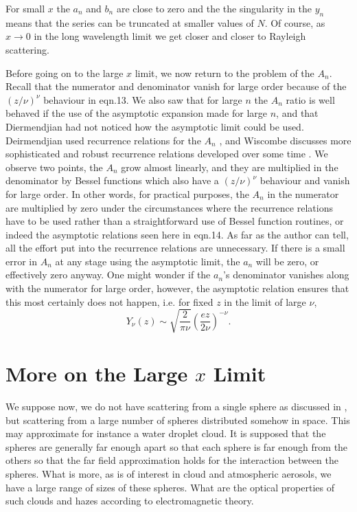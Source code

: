 For small $x$ the $a_n$ and $b_n$ are close to zero and the the singularity in the $y_n$
means that the series can be truncated at smaller values of $N$. Of course, as $x\rightarrow 0$
in the long wavelength limit we get closer and closer to Rayleigh scattering.

Before going on to the large $x$ limit, we now return to the problem of the $A_n$. Recall that
the numerator and denominator vanish for large order because of the $(z/\nu)^\nu$ behaviour
in eqn.13. We also saw that for large $n$ the $A_n$ ratio is well behaved if the use of
the asymptotic expansion made for large $n$, and that Diermendjian had not noticed how the asymptotic
limit could be used. Deirmendjian used recurrence relations for the $A_n$ \cite{Deirmendjian:Mybib}, 
and Wiscombe discusses more
sophisticated and robust recurrence relations developed over some time \cite{WisRep:Mybib}.
We observe two points, the $A_n$ grow almost linearly, and they are multiplied in the
denominator by Bessel functions which also have a $(z/\nu)^\nu$ behaviour and vanish for
large order. In other words, for practical purposes, the $A_n$ in the numerator are multiplied by zero
under the circumstances where the recurrence relations have to be used rather than
a straightforward use of Bessel function routines, or indeed the asymptotic relations
seen  here in eqn.14. As far as the author can tell, all the effort put into the recurrence
relations are unnecessary. If there is a small error in $A_n$ at any stage using the asymptotic limit,  
the $a_n$ will be zero, or effectively zero anyway. One might wonder if the $a_n$'s denominator vanishes
along with the numerator for large order, however, the asymptotic relation \cite{AbramowitzStegun:Mybib}
ensures that this most certainly does not happen, i.e. for fixed $z$ in the limit of large $\nu$, 
\begin{equation}
Y_\nu(z) \sim \sqrt{ \frac{2} {\pi \nu} } \left ( \frac{e z}{2 \nu} \right )^{-\nu}.
\end{equation}

\section{More on the Large $x$ Limit}

We suppose now, we do not have scattering from a single sphere as discussed
in \cite{EMScatt:Mybib}, but scattering from a large number of spheres distributed somehow in space. This may approximate for instance a water droplet cloud. It is supposed that the spheres are generally far enough apart so that each sphere is far enough from the others so that the far field approximation holds for the interaction between the spheres. What is more, as is of interest in cloud and atmospheric aerosols, we have a large range of sizes of these spheres. What are the optical properties of such clouds and hazes according to electromagnetic theory.

